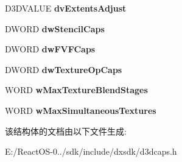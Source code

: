 \begin{DoxyCompactItemize}
D3\+D\+V\+A\+L\+UE {\bfseries dv\+Extents\+Adjust}
\item 
\mbox{\label{struct___d3_d_device_desc_a2e6a183ca8f65e64845e5a48f186c94e}} 
D\+W\+O\+RD {\bfseries dw\+Stencil\+Caps}
\item 
\mbox{\label{struct___d3_d_device_desc_aebbb2c130ac544828664d1592835f05b}} 
D\+W\+O\+RD {\bfseries dw\+F\+V\+F\+Caps}
\item 
\mbox{\label{struct___d3_d_device_desc_ac96c7efa2db23aa98dd9380797eb1902}} 
D\+W\+O\+RD {\bfseries dw\+Texture\+Op\+Caps}
\item 
\mbox{\label{struct___d3_d_device_desc_a666959c7e7e84e92d20bb3016ed51588}} 
W\+O\+RD {\bfseries w\+Max\+Texture\+Blend\+Stages}
\item 
\mbox{\label{struct___d3_d_device_desc_aeaac398d0587edf9a8c22b739c80b33a}} 
W\+O\+RD {\bfseries w\+Max\+Simultaneous\+Textures}
\end{DoxyCompactItemize}


该结构体的文档由以下文件生成\+:\begin{DoxyCompactItemize}
\item 
E\+:/\+React\+O\+S-\/0../sdk/include/dxsdk/d3dcaps.\+h\end{DoxyCompactItemize}
